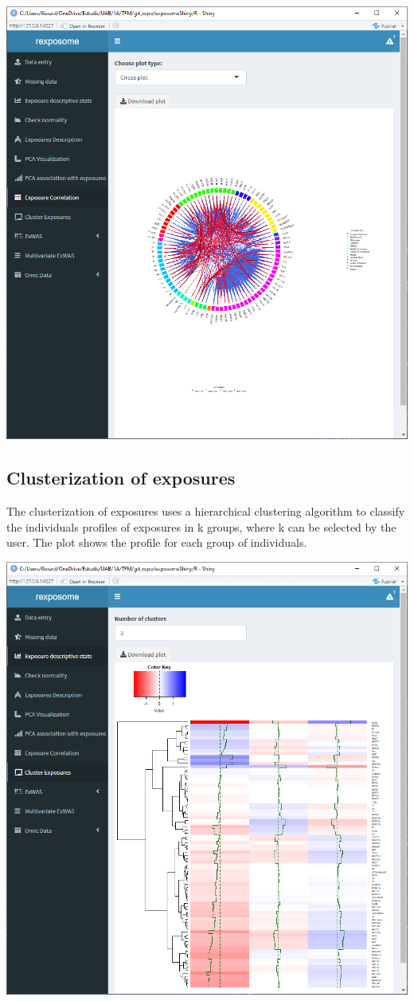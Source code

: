 \documentclass[
]{book}
\begin{document}
\includegraphics{images/analysis6_3.png}

\hypertarget{clusterization-of-exposures}{%
\subsection{Clusterization of exposures}\label{clusterization-of-exposures}}

The clusterization of exposures uses a hierarchical clustering algorithm to classify the individuals profiles of exposures in k groups, where k can be selected by the user. The plot shows the profile for each group of individuals.

\includegraphics{images/analysis6_4.png}
\end{document}
